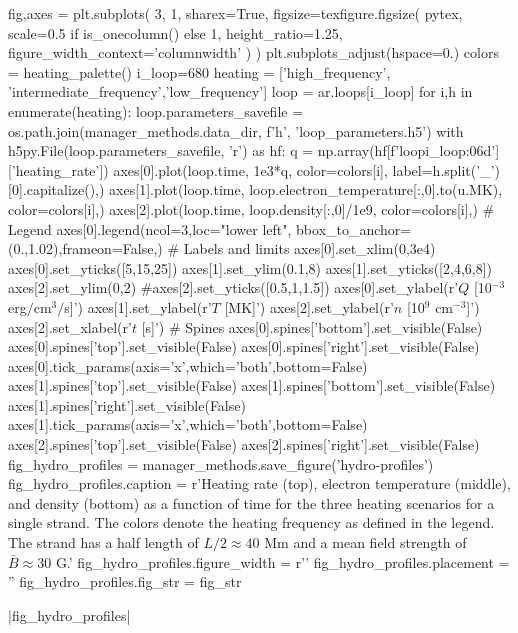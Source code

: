 \begin{pycode}
fig,axes = plt.subplots(
    3, 1, sharex=True,
    figsize=texfigure.figsize(
        pytex,
        scale=0.5 if is_onecolumn() else 1,
        height_ratio=1.25,
        figure_width_context='columnwidth'
    )
)
plt.subplots_adjust(hspace=0.)
colors = heating_palette()
i_loop=680
heating = ['high_frequency', 'intermediate_frequency','low_frequency']
loop = ar.loops[i_loop]
for i,h in enumerate(heating):
    loop.parameters_savefile = os.path.join(manager_methods.data_dir, f'{h}', 'loop_parameters.h5')
    with h5py.File(loop.parameters_savefile, 'r') as hf:
        q = np.array(hf[f'loop{i_loop:06d}']['heating_rate'])
    axes[0].plot(loop.time, 1e3*q, color=colors[i], label=h.split('_')[0].capitalize(),)
    axes[1].plot(loop.time, loop.electron_temperature[:,0].to(u.MK), color=colors[i],)
    axes[2].plot(loop.time, loop.density[:,0]/1e9, color=colors[i],)
# Legend
axes[0].legend(ncol=3,loc="lower left", bbox_to_anchor=(0.,1.02),frameon=False,)
# Labels and limits
axes[0].set_xlim(0,3e4)
axes[0].set_yticks([5,15,25])
axes[1].set_ylim(0.1,8)
axes[1].set_yticks([2,4,6,8])
axes[2].set_ylim(0,2)
#axes[2].set_yticks([0.5,1,1.5])
axes[0].set_ylabel(r'$Q$ [10$^{-3}$ erg$/$cm$^{3}$$/$s]')
axes[1].set_ylabel(r'$T$ [MK]')
axes[2].set_ylabel(r'$n$ [10$^9$ cm$^{-3}$]')
axes[2].set_xlabel(r'$t$ [s]')
# Spines
axes[0].spines['bottom'].set_visible(False)
axes[0].spines['top'].set_visible(False)
axes[0].spines['right'].set_visible(False)
axes[0].tick_params(axis='x',which='both',bottom=False)
axes[1].spines['top'].set_visible(False)
axes[1].spines['bottom'].set_visible(False)
axes[1].spines['right'].set_visible(False)
axes[1].tick_params(axis='x',which='both',bottom=False)
axes[2].spines['top'].set_visible(False)
axes[2].spines['right'].set_visible(False)
fig_hydro_profiles = manager_methods.save_figure('hydro-profiles')
fig_hydro_profiles.caption = r'Heating rate (top), electron temperature (middle), and density (bottom) as a function of time for the three heating scenarios for a single strand. The colors denote the heating frequency as defined in the legend. The strand has a half length of $L/2\approx40$ Mm and a mean field strength of $\bar{B}\approx30$ G.'
fig_hydro_profiles.figure_width = r'\columnwidth'
fig_hydro_profiles.placement = ''
fig_hydro_profiles.fig_str = fig_str
\end{pycode}
|fig_hydro_profiles|

